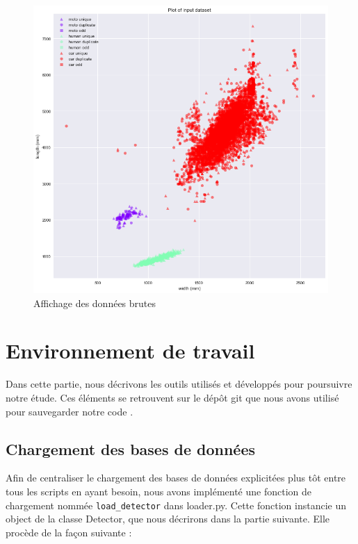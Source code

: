 \documentclass[a4paper]{report}
\begin{document}
\begin{figure}[hb]
\includegraphics[width=\textwidth]{img/input_dataset.png}
\caption{Affichage des données brutes}
\end{figure}
 

\section{Environnement de travail}

Dans cette partie, nous décrivons les outils utilisés et développés pour poursuivre notre étude. Ces éléments se retrouvent sur le dépôt git que nous avons utilisé pour sauvegarder notre code \cite{git}.

\subsection{Chargement des bases de données}

Afin de centraliser le chargement des bases de données explicitées plus tôt entre tous les scripts en ayant besoin, nous avons implémenté une fonction de chargement nommée \texttt{load\_detector} dans loader.py. Cette fonction instancie un object de la classe Detector, que nous décrirons dans la partie suivante. Elle procède de la façon suivante :
\end{document}
